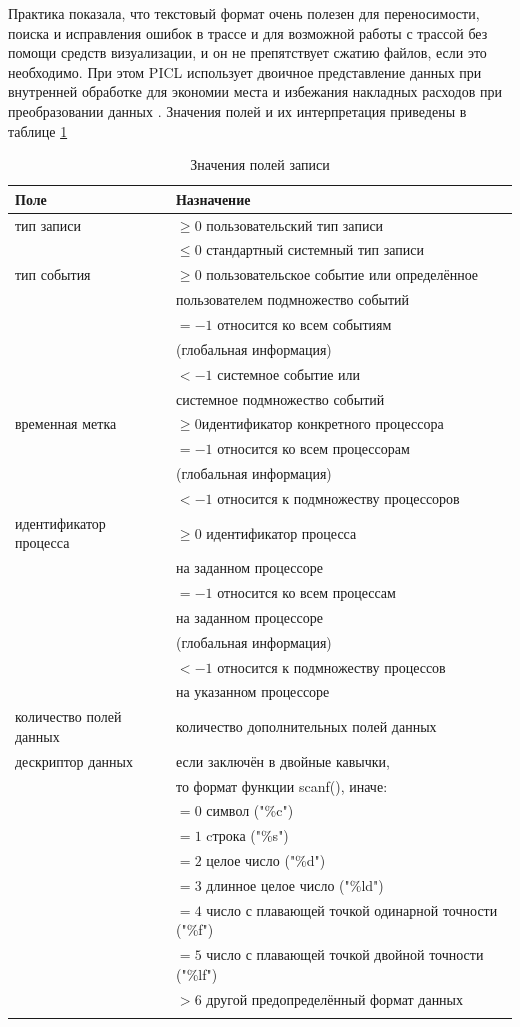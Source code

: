 Практика показала, что текстовый формат очень полезен для переносимости, поиска и исправления ошибок в трассе и для возможной работы с трассой без помощи средств визуализации, и он не препятствует сжатию файлов, если это необходимо. При этом PICL использует двоичное представление данных при внутренней обработке для экономии места и избежания накладных расходов при преобразовании данных \cite{book4}.
Значения полей и их интерпретация приведены в таблице \ref{tab:tbl2}
\begin{table}[h!]
	\caption{\label{tab:tbl2} Значения полей записи}
	\begin{tabular}{|l|l|}
		\hline
		Поле & Назначение \\
		\hline\hline
		тип записи& $\geq0$ пользовательский тип записи\tabularnewline & $\le0$ стандартный системный тип записи
		\\\hline
		тип события & $\geq0$ пользовательское событие или определённое \tabularnewline & пользователем подмножество событий\tabularnewline & $=-1$ относится ко всем событиям \tabularnewline &(глобальная информация)
		\tabularnewline & $<-1$ системное событие или \tabularnewline &системное подмножество событий
		\\\hline
		временная метка& $\geq0$идентификатор конкретного процессора\tabularnewline & $=-1$ относится ко всем процессорам \tabularnewline &(глобальная информация)
		\tabularnewline & $<-1$ относится к подмножеству процессоров
		\\\hline
		идентификатор процесса
		&$\geq0$ идентификатор процесса\tabularnewline & на заданном процессоре\tabularnewline & $=-1$ относится ко всем процессам\tabularnewline & на заданном процессоре \tabularnewline &(глобальная информация)
		\tabularnewline & $<-1$ относится к подмножеству процессов\tabularnewline & на указанном процессоре
		\\\hline
		количество полей данных	
		&количество дополнительных полей данных	
		\\\hline
		дескриптор данных
		& если заключён в двойные кавычки,\tabularnewline & то формат функции scanf(),
		иначе:\tabularnewline &
		$=0$  символ ("\%c") \tabularnewline & $=1$ cтрока ("\%s") \tabularnewline &
		$=2$ целое число ("\%d") \tabularnewline &
		$=3$ длинное целое число  ("\%ld") \tabularnewline &
		$=4$ число с плавающей точкой одинарной точности  ("\%f") \tabularnewline &
		$=5$ число с плавающей точкой двойной точности   ("\%lf") \tabularnewline &
		$>6$ другой предопределённый формат данных \tabularnewline &
		
		
		\\\hline
		
	\end{tabular}
\end{table}

